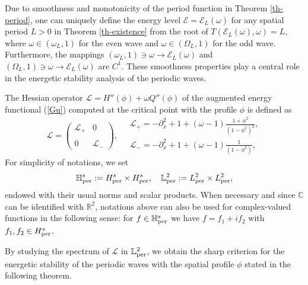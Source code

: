 \documentclass[12pt,reqno]{amsart}
\numberwithin{equation}{section}
\numberwithin{figure}{section}
\begin{document}
Due to smoothness and monotonicity of the period function in Theorem \ref{th-period}, one can uniquely define the energy level $\mathcal{E} = \mathcal{E}_L(\omega)$ for any spatial period $L > 0$ in Theorem \ref{th-existence} from the root of $T(\mathcal{E}_L(\omega),\omega) = L$, where $\omega \in (\omega_L,1)$ for the even wave and $\omega \in (\Omega_L,1)$ for the odd wave. Furthermore, the mappings $(\omega_L,1) \ni \omega \to \mathcal{E}_L(\omega)$ and $(\Omega_L,1) \ni \omega \to \mathcal{E}_L(\omega)$ are $C^1$. These smoothness properties play a central role in the energetic stability analysis of the periodic waves. 


The Hessian operator $\mathcal{L} = H''(\phi) + \omega Q''(\phi)$ 
of the augmented energy functional (\ref{Gu}) computed at the critical point with the profile $\phi$ is defined as
	\begin{equation}
	\label{matrixop}
		\mathcal{L} = \left(\begin{array}{cccc} \mathcal{L}_{+}& 0\\\\
							0 & \mathcal{L}_{-}\end{array}\right), \quad 
\begin{array}{l} 
\mathcal{L}_+ = -\partial_x^2+1+(\omega-1)\frac{1+\phi^2}{(1-\phi^2)^2}, \\
\mathcal{L}_- = -\partial_x^2+1+(\omega-1)\frac{1}{(1-\phi^2)}, 
\end{array}
	\end{equation}
For simplicity of notations, we set
$$
\mathbb{H}^s_{\rm per}:= H^s_{\rm per} \times H^s_{\rm per}, \quad 
\mathbb{L}^2_{\rm per}:= L^2_{\rm per} \times L^2_{\rm per},
$$
endowed with their usual norms and scalar products. When necessary and since $\mathbb{C}$ can be identified with $\mathbb{R}^2$, notations above can also be used for complex-valued functions in the following sense: for $f\in \mathbb{H}_{\rm per}^s$ we have $f=f_1+if_2$ with $f_1, f_2 \in H_{\rm per}^s$. 

By studying the spectrum of $\mathcal{L}$ in $\mathbb{L}^2_{\rm per}$, we obtain the sharp criterion for the energetic stability of the periodic waves with the spatial profile $\phi$ stated in the following theorem. 
\end{document}
